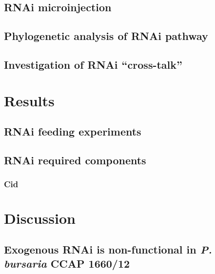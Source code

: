             


\subsection{RNAi microinjection}


\subsection{Phylogenetic analysis of RNAi pathway}


\subsection{Investigation of RNAi ``cross-talk''}


\section{Results}

\subsection{RNAi feeding experiments}




\subsection{RNAi required components}

\subsubsection{Cid}






\section{Discussion}

\subsection{Exogenous RNAi is non-functional in \textit{P. bursaria} CCAP 1660/12}



